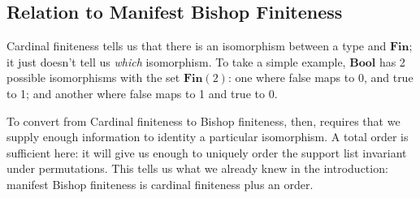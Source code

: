\subsection{Relation to Manifest Bishop Finiteness}
Cardinal finiteness tells us that there is an isomorphism between a type and
\(\mathbf{Fin}\); it just doesn't tell us \emph{which} isomorphism.
To take a simple example, \(\mathbf{Bool}\) has 2 possible isomorphisms with the
set \(\mathbf{Fin}(2)\): one where false maps to 0, and true to 1; and another
where false maps to 1 and true to 0.

To convert from Cardinal finiteness to Bishop finiteness, then, requires that we
supply enough information to identity a particular isomorphism.
A total order is sufficient here: it will give us enough to uniquely order the
support list invariant under permutations.
This tells us what we already knew in the introduction: manifest Bishop
finiteness is cardinal finiteness plus an order.

